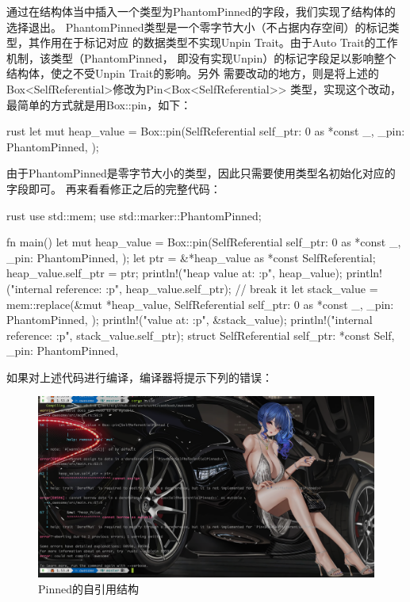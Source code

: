 通过在结构体当中插入一个类型为PhantomPinned的字段，我们实现了结构体的选择退出。
PhantomPinned类型是一个零字节大小（不占据内存空间）的标记类型，其作用在于标记对应
的数据类型不实现Unpin Trait。由于Auto Trait的工作机制，该类型（PhantomPinned，
即没有实现Unpin）的标记字段足以影响整个结构体，使之不受Unpin Trait的影响。另外
需要改动的地方，则是将上述的Box<SelfReferential>修改为Pin<Box<SelfReferential>>
类型，实现这个改动，最简单的方式就是用Box::pin，如下：
\begin{code-block}{rust}
let mut heap_value = Box::pin(SelfReferential {
    self_ptr: 0 as *const _,
    _pin: PhantomPinned,
});
\end{code-block}
由于PhantomPinned是零字节大小的类型，因此只需要使用类型名初始化对应的字段即可。
再来看看修正之后的完整代码：
\begin{code-block}{rust}
use std::mem;
use std::marker::PhantomPinned;

fn main() {
    let mut heap_value = Box::pin(SelfReferential {
        self_ptr: 0 as *const _,
        _pin: PhantomPinned,
    });
    let ptr = &*heap_value as *const SelfReferential;
    heap_value.self_ptr = ptr;
    println!("heap value at: {:p}", heap_value);
    println!("internal reference: {:p}", heap_value.self_ptr);
    // break it
    let stack_value = mem::replace(&mut *heap_value, SelfReferential {
        self_ptr: 0 as *const _,
        _pin: PhantomPinned,
    });
    println!("value at: {:p}", &stack_value);
    println!("internal reference: {:p}", stack_value.self_ptr);
}
struct SelfReferential {
    self_ptr: *const Self,
    _pin: PhantomPinned,
}
\end{code-block}
如果对上述代码进行编译，编译器将提示下列的错误：
\begin{figure}[H]
  \centering
  \includegraphics[width=\linewidth]{self_ref_pinned.png}
  \caption{Pinned的自引用结构}
  \label{fig:self_ref_pinned}
\end{figure}

